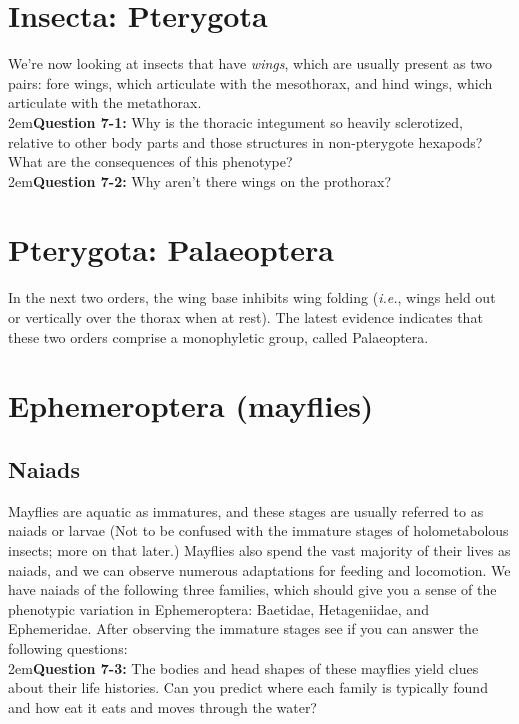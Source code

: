 \documentclass[letterpaper, 11pt]{article}
\begin{document}
\section*{Insecta: Pterygota}
We're now looking at insects that have \textit{wings}, which are usually present as two pairs: fore wings, which articulate with the mesothorax, and hind wings, which articulate with the metathorax.\\

\hangindent2em\textbf{Question 7-1:} Why is the thoracic integument so heavily sclerotized, relative to other body parts and those structures in non-pterygote hexapods? What are the consequences of this phenotype?\\

\hangindent2em\textbf{Question 7-2:} Why aren't there wings on the prothorax?

\section*{Pterygota: Palaeoptera}
In the next two orders, the wing base inhibits wing folding (\textit{i.e.}, wings held out or vertically over the thorax when at rest). The latest evidence indicates that these two orders comprise a monophyletic group, called Palaeoptera.

\section{Ephemeroptera (mayflies)}

\subsection{Naiads}
Mayflies are aquatic as immatures, and these stages are usually referred to as naiads or larvae (Not to be confused with the immature stages of holometabolous insects; more on that later.) Mayflies also spend the vast majority of their lives as naiads, and we can observe numerous adaptations for feeding and locomotion. We have naiads of the following three families, which should give you a sense of the phenotypic variation in Ephemeroptera: Baetidae, Hetageniidae, and Ephemeridae. After observing the immature stages see if you can answer the following questions:\\

\hangindent2em\textbf{Question 7-3:} The bodies and head shapes of these mayflies yield clues about their life histories. Can you predict where each family is typically found and how eat it eats and moves through the water?\\
\end{document}

